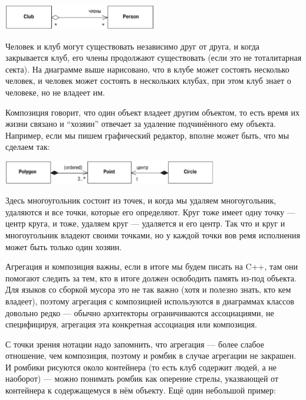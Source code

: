 \documentclass[a5paper]{article}
\begin{document}
\begin{center}
	\includegraphics[width=0.5\textwidth]{aggregation.png}
\end{center}

Человек и клуб могут существовать независимо друг от друга, и когда закрывается клуб, его члены продолжают существовать (если это не тоталитарная секта). На диаграмме выше нарисовано, что в клубе может состоять несколько человек, и человек может состоять в нескольких клубах, при этом клуб знает о человеке, но не владеет им.

Композиция говорит, что один объект владеет другим объектом, то есть время их жизни связано и ``хозяин'' отвечает за удаление подчинённого ему объекта. Например, если мы пишем графический редактор, вполне может быть, что мы сделаем так:

\begin{center}
	\includegraphics[width=0.7\textwidth]{composition.png}
\end{center}

Здесь многоугольник состоит из точек, и когда мы удаляем многоугольник, удаляются и все точки, которые его определяют. Круг тоже имеет одну точку --- центр круга, и тоже, удаляем круг --- удаляется и его центр. Так что и круг и многоугольник владеют своими точками, но у каждой точки вов ремя исполнения может быть только один хозяин.

Агрегация и композиция важны, если в итоге мы будем писать на C++, там они помогают следить за тем, кто в итоге должен освободить память из-под объекта. Для языков со сборкой мусора это не так важно (хотя и полезно знать, кто кем владеет), поэтому агрегация с композицией используются в диаграммах классов довольно редко --- обычно архитекторы ограничиваются ассоциациями, не специфицируя, агрегация эта конкретная ассоциация или композиция.

С точки зрения нотации надо запомнить, что агрегация --- более слабое отношение, чем композиция, поэтому и ромбик в случае агрегации не закрашен. И ромбики рисуются около контейнера (то есть клуб содержит людей, а не наоборот) --- можно понимать ромбик как оперение стрелы, указвающей от контейнера к содержащемуся в нём объекту. Ещё один небольшой пример:
\end{document}
